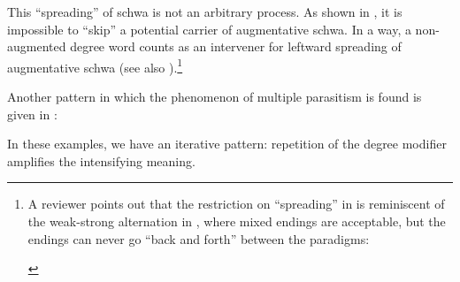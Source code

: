 \documentclass[output=paper]{langsci/langscibook}
\begin{document}
This \enquote{spreading} of schwa is not an arbitrary process. As shown in
, it is impossible to \enquote{skip} a potential carrier of
augmentative schwa. In a way, a non-augmented degree word counts as an
intervener for leftward spreading of augmentative schwa (see also
\citealt{Corver1997a,Broekhuis2013}).\footnote{A reviewer points out
    that the restriction on \enquote{spreading} in  is
    reminiscent of the weak-strong alternation in , where mixed endings
    are acceptable, but the endings can never go \enquote{back and forth}
    between the paradigms:

\begin{exe}
    \begin{xlist}
    \end{xlist}
\end{exe}}

\ea%
    \label{ex:18.18}
	\z
\z

Another pattern in which the phenomenon of multiple parasitism is found is
given in :

\ea%
    \label{ex:18.19}
	\z
\z

In these examples, we have an iterative pattern: repetition of the degree
modifier amplifies the intensifying meaning.
\end{document}
